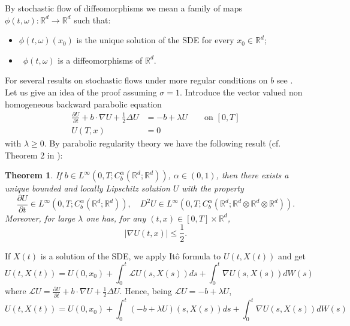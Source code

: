 \documentclass{article}
\newtheorem{theorem}{Theorem}
\begin{document}
By stochastic flow of diffeomorphisms we mean a family of maps $\phi\left(
t,\omega\right)  :\mathbb{R}^{d}\rightarrow\mathbb{R}^{d}$ such that:
\begin{itemize}
\item[i)] $\phi\left(  t,\omega\right)  \left(  x_{0}\right)  $ is the
 unique
solution of the SDE for every $x_{0}\in\mathbb{R}^{d}$;
\item[ii)]\ $\phi\left(  t,\omega\right)  $ is a diffeomorphisms of $\mathbb{R}^{d}$.
\end{itemize}
For several results on stochastic flows under more regular
conditions on $b$ see \cite{K}. Let us give an idea of the proof
assuming $\sigma =1$. Introduce the vector valued non homogeneous
backward parabolic equation%
\begin{align*}
\frac{\partial U}{\partial t}+b\cdot\nabla U+\frac{1}{2}\Delta U  &
=-b+\lambda U\qquad\text{on }\left[  0,T\right] \\
U\left(  T,x\right)   &  =0
\end{align*}
with $\lambda\geq0$. By parabolic regularity theory we have the
following result (cf.  Theorem 2 in \cite{FGP}):
\begin{theorem}
\label{theorem SDE flux}If $b\in L^{\infty}\left(  0,T
;C_{b}^{\alpha}\left( \mathbb{R}^{d};\mathbb{R}^{d}\right)  \right)
$, $\alpha \in (0,1)$, then there exists a unique bounded and
locally Lipschitz
 solution $U$ with the property
\[
\frac{\partial U}{\partial t} \in L^{\infty}\left( 0,T
;C_{b}^{\alpha}( \mathbb{R}^{d}; \mathbb{R}^{d}) \right),\quad
D^{2}U\in L^{\infty}\left( 0,T ;C_{b}^{\alpha}\left( \mathbb{R}^{d};
\mathbb{R}^{d} \otimes \mathbb{R}^{d} \otimes \mathbb{R}^{d} \right)
\right).
\]
Moreover, for large $\lambda$ one has, for any $(t,x) \in [0,T]
\times \mathbb R^d$,
\[
\left\vert \nabla U\left(  t,x\right)  \right\vert \leq\frac{1}{2}.
\]
\end{theorem}
 \noindent If $X\left(  t\right)  $ is a solution of the SDE, we apply It\^{o}
formula to
$U\left(  t,X\left(  t\right)  \right)  $ and get%
\[
U\left(  t,X\left(  t\right)  \right)  =U\left(  0,x_{0}\right)  +\int_{0}%
^{t}\mathcal{L}U\left(  s,X\left(  s\right)  \right)  ds+\int_{0}^{t}\nabla
U\left(  s,X\left(  s\right)  \right)  dW\left(  s\right)
\]
where $\mathcal{L}U=\frac{\partial U}{\partial t}+b\cdot\nabla U+\frac{1}%
{2}\Delta U$. Hence, being $\mathcal{L}U=-b+\lambda U$,
\[
U\left(  t,X\left(  t\right)  \right)  =U\left(  0,x_{0}\right)  +\int_{0}%
^{t}\left(  -b+\lambda U\right)  \left(  s,X\left(  s\right)  \right)
ds+\int_{0}^{t}\nabla U\left(  s,X\left(  s\right)  \right)  dW\left(
s\right)
\]
\end{document}
